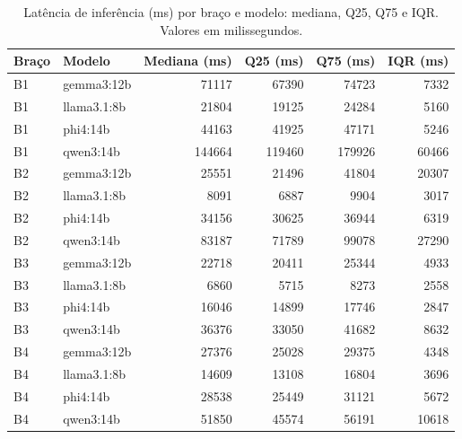 \begin{table}[htbp]
\centering
\caption{Latência de inferência (ms) por braço e modelo: mediana, Q25, Q75 e IQR. Valores em milissegundos.}
\label{tab:t2_latencia}
\small
\begin{tabular}{llrrrr}
\toprule
Braço & Modelo & Mediana (ms) & Q25 (ms) & Q75 (ms) & IQR (ms) \\
\midrule
B1 & gemma3:12b & 71117 & 67390 & 74723 & 7332 \\
B1 & llama3.1:8b & 21804 & 19125 & 24284 & 5160 \\
B1 & phi4:14b & 44163 & 41925 & 47171 & 5246 \\
B1 & qwen3:14b & 144664 & 119460 & 179926 & 60466 \\
B2 & gemma3:12b & 25551 & 21496 & 41804 & 20307 \\
B2 & llama3.1:8b & 8091 & 6887 & 9904 & 3017 \\
B2 & phi4:14b & 34156 & 30625 & 36944 & 6319 \\
B2 & qwen3:14b & 83187 & 71789 & 99078 & 27290 \\
B3 & gemma3:12b & 22718 & 20411 & 25344 & 4933 \\
B3 & llama3.1:8b & 6860 & 5715 & 8273 & 2558 \\
B3 & phi4:14b & 16046 & 14899 & 17746 & 2847 \\
B3 & qwen3:14b & 36376 & 33050 & 41682 & 8632 \\
B4 & gemma3:12b & 27376 & 25028 & 29375 & 4348 \\
B4 & llama3.1:8b & 14609 & 13108 & 16804 & 3696 \\
B4 & phi4:14b & 28538 & 25449 & 31121 & 5672 \\
B4 & qwen3:14b & 51850 & 45574 & 56191 & 10618 \\
\bottomrule
\end{tabular}
\end{table}
